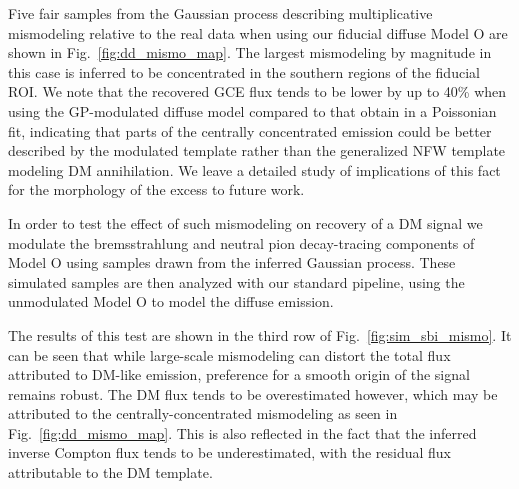 \documentclass[prd,aps,10pt,nofootinbib,twocolumn,superscriptaddress,preprintnumbers,balancelastpage,longbibliography]{revtex4-1}
\begin{document}
Five fair samples from the Gaussian process describing multiplicative mismodeling relative to the real \Fermi data when using our fiducial diffuse Model O are shown in Fig.~\ref{fig:dd_mismo_map}. The largest mismodeling by magnitude in this case is inferred to be concentrated in the southern regions of the fiducial ROI. We note that the recovered GCE flux tends to be lower by up to 40\% when using the GP-modulated diffuse model compared to that obtain in a Poissonian fit, indicating that parts of the centrally concentrated emission could be better described by the modulated template rather than the generalized NFW template modeling DM annihilation. We leave a detailed study of implications of this fact for the morphology of the excess to future work.

In order to test the effect of such mismodeling on recovery of a DM signal we modulate the bremsstrahlung and neutral pion decay-tracing components of Model O using samples drawn from the inferred Gaussian process. These simulated samples are then analyzed with our standard pipeline, using the unmodulated Model O to model the diffuse emission.

The results of this test are shown in the third row of Fig.~\ref{fig:sim_sbi_mismo}. It can be seen that while large-scale mismodeling can distort the total flux attributed to DM-like emission, preference for a smooth origin of the signal remains robust. The DM flux tends to be overestimated however, which may be attributed to the centrally-concentrated mismodeling as seen in Fig.~\ref{fig:dd_mismo_map}. This is also reflected in the fact that the inferred inverse Compton flux tends to be underestimated, with the residual flux attributable to the DM template. \\

\end{document}
